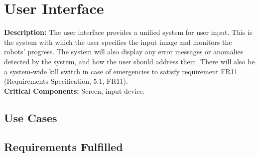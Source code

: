 
\section{User Interface}
\label{sec:user_interface}
\textbf{Description:} The user interface provides a unified system for user input. This is the system with which the user specifies the input image and monitors the robots' progress. The system will also display any error messages or anomalies detected by the system, and how the user should address them. There will also be a system-wide kill switch in case of emergencies to satisfy requirement FR11 (Requirements Specification, 5.1, FR11). \\
\textbf{Critical Components:} Screen, input device. \\

\subsection{Use Cases}

\subsection{Requirements Fulfilled}